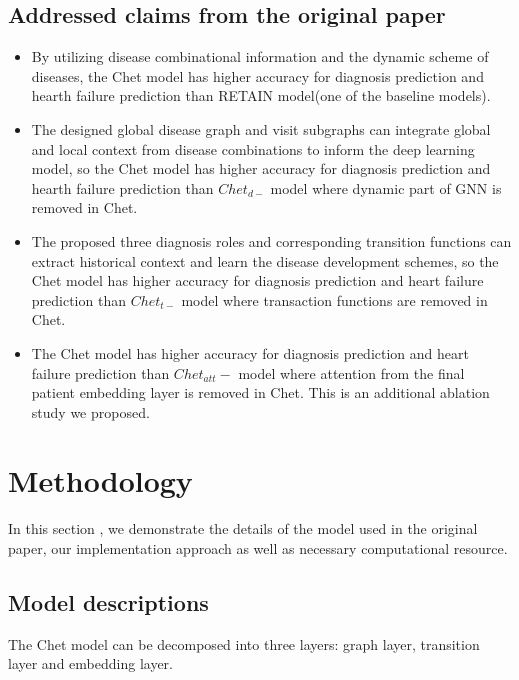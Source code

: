 \documentclass[11pt,a4paper,fleqn]{article}
\begin{document}
\subsection{Addressed claims from the original paper}
\begin{itemize}
    \item By utilizing disease combinational information and the dynamic scheme
    of diseases, the Chet model has higher accuracy for diagnosis prediction and
    hearth failure prediction than RETAIN model(one of the baseline models). 
    \item The designed global disease graph and visit subgraphs can integrate
    global and local context from disease combinations to inform the deep
    learning model, so the Chet model has higher accuracy for diagnosis
    prediction and hearth failure prediction than $Chet_{d-}$ model where dynamic
    part of GNN is removed in Chet.
    \item The proposed three diagnosis roles and corresponding transition
    functions can extract historical context and learn the disease development
    schemes, so the Chet model has higher accuracy for diagnosis prediction and
    heart failure prediction than $Chet_{t-}$ model where transaction functions
    are removed in Chet.
    \item The Chet model has higher accuracy for diagnosis prediction and
    heart failure prediction than $Chet_{att}-$ model where attention from the
    final patient embedding layer is removed in Chet. This is an additional
    ablation study we proposed.
\end{itemize}

\section{Methodology}
In this section , we demonstrate the details of the model used in the original
paper, our implementation approach as well as necessary computational resource.
\subsection{Model descriptions}
The Chet model can be decomposed into three layers: graph layer, transition
layer and embedding layer.
\end{document}
